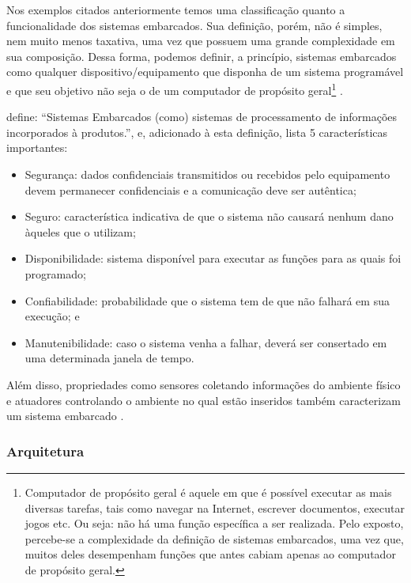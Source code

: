 Nos exemplos citados anteriormente temos uma classificação quanto a 
funcionalidade dos sistemas embarcados. Sua definição, porém, não é simples, nem muito menos taxativa,
uma vez que possuem uma grande complexidade em sua composição. Dessa forma,
podemos definir, a princípio, sistemas embarcados como qualquer
dispositivo/equipamento que disponha de um sistema programável e que seu
objetivo não seja o de um computador de propósito geral\footnote{Computador de
propósito geral é aquele em que é possível executar as mais diversas tarefas,
tais como navegar na Internet, escrever documentos, executar jogos etc. Ou
seja: não há uma função específica a ser realizada. Pelo exposto, percebe-se a
complexidade da definição de sistemas embarcados, uma vez que, muitos deles
desempenham funções que antes cabiam apenas ao computador de propósito geral.}
\cite{wolf2012computers}.

 define: ``Sistemas Embarcados (como) sistemas
de processamento de informações incorporados à produtos.'', e, adicionado à
esta definição, lista 5 características importantes: 

\begin{itemize}
  \item Segurança: dados confidenciais transmitidos ou recebidos pelo
  equipamento devem permanecer confidenciais e a comunicação deve ser autêntica;
  \item Seguro: característica indicativa de que o sistema não causará nenhum dano àqueles que o utilizam;
  \item Disponibilidade: sistema disponível para executar as funções para as quais
  foi programado; 
  \item Confiabilidade: probabilidade que o sistema tem de que não
  falhará em sua execução; e
  \item Manutenibilidade: caso o sistema venha a falhar, deverá 
  ser consertado em uma determinada janela de tempo.
\end{itemize}

Além disso, propriedades como sensores coletando informações do ambiente
físico e atuadores controlando o ambiente no qual estão inseridos também
caracterizam um sistema embarcado \cite{marwedel2010embedded}.

\subsubsection{Arquitetura}\label{subsubsec:arquitetura}

